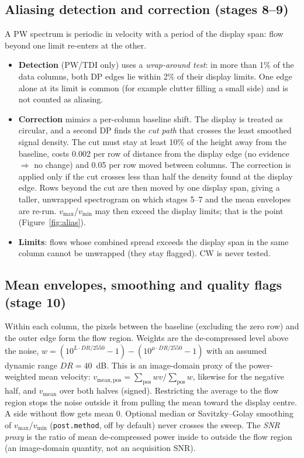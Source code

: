 \documentclass[10pt,a4paper]{article}
\newcommand{\code}[1]{\texttt{\small #1}}
\newcommand{\vmax}{v_{\max}}
\newcommand{\vmin}{v_{\min}}
\begin{document}
\subsection{Aliasing detection and correction (stages 8--9)}
A PW spectrum is periodic in velocity with a period of the display span: flow beyond one limit re-enters at the other.
\begin{itemize}
\item \textbf{Detection} (PW/TDI only) uses a \emph{wrap-around test}: in more than 1\% of the data columns, both DP edges lie within 2\% of their display limits.
One edge alone at its limit is common (for example clutter filling a small side) and is not counted as aliasing.
\item \textbf{Correction} mimics a per-column baseline shift. The display is treated as circular, and a second DP finds the \emph{cut path} that
crosses the least smoothed signal density. The cut must stay at least 10\% of the height away from the baseline, costs 0.002 per row
of distance from the display edge (no evidence $\Rightarrow$ no change) and 0.05 per row moved between columns. The correction is applied only if
the cut crosses less than half the density found at the display edge. Rows beyond the cut are then moved by one display span, giving a taller,
unwrapped spectrogram on which stages 5--7 and the mean envelopes are re-run. $\vmax$/$\vmin$ may then exceed the display limits;
that is the point (Figure~\ref{fig:alias}).
\item \textbf{Limits}: flows whose combined spread exceeds the display span in the same column cannot be unwrapped (they stay flagged).
CW is never tested.
\end{itemize}

\subsection{Mean envelopes, smoothing and quality flags (stage 10)}
Within each column, the pixels between the baseline (excluding the zero row) and the outer edge form the flow region. Weights are the
de-compressed level above the noise, $w = (10^{L\cdot DR/2550}-1) - (10^{\mu\cdot DR/2550}-1)$ with an assumed dynamic range $DR=40$~dB.
This is an image-domain proxy of the power-weighted mean velocity:
$v_{\mathrm{mean,pos}} = \sum_{\mathrm{pos}} w v / \sum_{\mathrm{pos}} w$, likewise for the negative half, and $v_{\mathrm{mean}}$ over both halves (signed).
Restricting the average to the flow region stops the noise outside it from pulling the mean toward the display centre. A side without flow
gets mean 0. Optional median or Savitzky--Golay smoothing of $\vmax$/$\vmin$ (\code{post.method}, off by default) never crosses the sweep.
The \emph{SNR proxy} is the ratio of mean de-compressed power inside to outside the flow region (an image-domain quantity, not an
acquisition SNR).
\end{document}
